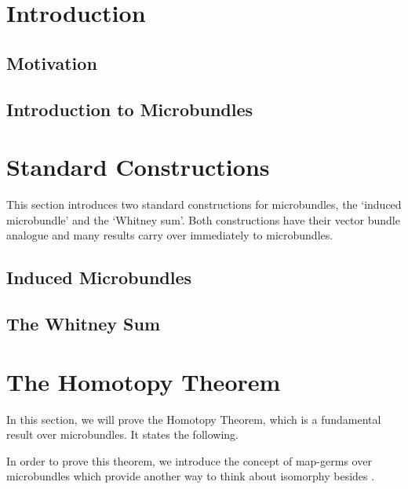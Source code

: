 \documentclass{article}
\begin{document}


\tableofcontents
\clearpage
\section{Introduction}\label{chapter::introduction}
\subsection*{Motivation}\label{section::motivation}{\blankbreak}

\subsection*{Introduction to Microbundles}\label{section::microbundle}{\blankbreak}

\section{Standard Constructions}\label{chapter::constructions}
\begin{myparagraph}
    This section introduces two standard constructions for microbundles,
    the `induced microbundle' and the `Whitney sum'.
    Both constructions have their vector bundle analogue
    and many results carry over immediately to microbundles.
\end{myparagraph}
\subsection*{Induced Microbundles}\label{section::induced}{\blankbreak}

\subsection*{The Whitney Sum}\label{section::whitney}

\section{The Homotopy Theorem}\label{chapter::homotopy}
\begin{myparagraph}
    In this section, we will prove the Homotopy Theorem,
    which is a fundamental result over microbundles.
    It states the following.
\end{myparagraph}

\begin{myparagraph}
    In order to prove this theorem,
    we introduce the concept of map-germs
    over microbundles which provide another way
    to think about isomorphy besides .
\end{myparagraph}


\end{document}
